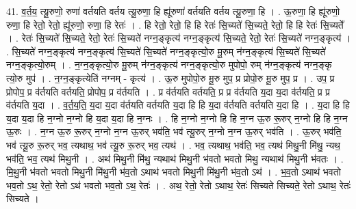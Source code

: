 \documentclass[17pt]{extarticle}
\begin{document}
41. व॒र्त॒य॒ त्यू॒रुणो॒ रुणा॑ वर्तयति वर्तय त्यू॒रुणा॒ हि ह्यू॑रुणा॑ वर्तयति वर्तय त्यू॒रुणा॒ हि । . ऊ॒रुणा॒ हि ह्यू॑रुणो॒ रुणा॒ हि रेतो॒ रेतो॒ ह्यू॑रुणो॒ रुणा॒ हि रेतः॑ । . हि रेतो॒ रेतो॒ हि हि रेतः॑ सि॒च्यते॑ सि॒च्यते॒ रेतो॒ हि हि रेतः॑ सि॒च्यते᳚ । . रेतः॑ सि॒च्यते॑ सि॒च्यते॒ रेतो॒ रेतः॑ सि॒च्यते॑ नग्न॒ङ्कृत्य॑ नग्न॒ङ्कृत्य॑ सि॒च्यते॒ रेतो॒ रेतः॑ सि॒च्यते॑ नग्न॒ङ्कृत्य॑ । . सि॒च्यते॑ नग्न॒ङ्कृत्य॑ नग्न॒ङ्कृत्य॑ सि॒च्यते॑ सि॒च्यते॑ नग्न॒ङ्कृत्यो॒रु मू॒रुम् न॑ग्न॒ङ्कृत्य॑ सि॒च्यते॑ सि॒च्यते॑ नग्न॒ङ्कृत्यो॒रुम् । . न॒ग्न॒ङ्कृत्यो॒रु मू॒रुम् न॑ग्न॒ङ्कृत्य॑ नग्न॒ङ्कृत्यो॒रु मुपोपो॒ रुम् न॑ग्न॒ङ्कृत्य॑ नग्न॒ङ्कृ
त्यो॒रु मुप॑ । . न॒ग्न॒ङ्कृत्येति॑ नग्नम् - कृत्य॑ । . ऊ॒रु मुपोपो॒रु मू॒रु मुप॒ प्र प्रोपो॒रु मू॒रु मुप॒ प्र । . उप॒ प्र प्रोपोप॒ प्र व॑र्तयति वर्तयति॒ प्रोपोप॒ प्र व॑र्तयति । . प्र व॑र्तयति वर्तयति॒ प्र प्र व॑र्तयति य॒दा य॒दा व॑र्तयति॒ प्र प्र व॑र्तयति य॒दा । . व॒र्त॒य॒ति॒ य॒दा य॒दा व॑र्तयति वर्तयति य॒दा हि हि य॒दा व॑र्तयति वर्तयति य॒दा हि । . य॒दा हि हि य॒दा य॒दा हि न॒ग्नो न॒ग्नो हि य॒दा य॒दा हि न॒ग्नः । . हि न॒ग्नो न॒ग्नो हि हि न॒ग्न ऊ॒रु रू॒रुर् न॒ग्नो हि हि न॒ग्न ऊ॒रुः । . न॒ग्न ऊ॒रु रू॒रुर् न॒ग्नो न॒ग्न ऊ॒रुर् भव॑ति॒ भव॑ त्यू॒रुर् न॒ग्नो न॒ग्न ऊ॒रुर् भव॑ति । . ऊ॒रुर् भव॑ति॒ भव॑ त्यू॒रु रू॒रुर् भव॒ त्यथाथ॒ भव॑ त्यू॒रु रू॒रुर् भव॒ त्यथ॑ । . भव॒ त्यथाथ॒ भव॑ति॒ भव॒ त्यथ॑ मिथु॒नी मि॑थु॒ न्यथ॒ भव॑ति॒ भव॒ त्यथ॑ मिथु॒नी । . अथ॑ मिथु॒नी मि॑थु॒ न्यथाथ॑ मिथु॒नी भ॑वतो भवतो मिथु॒ न्यथाथ॑ मिथु॒नी भ॑वतः । . मि॒थु॒नी भ॑वतो भवतो मिथु॒नी मि॑थु॒नी भ॑व॒तो ऽथाथ॑ भवतो मिथु॒नी मि॑थु॒नी भ॑व॒तो ऽथ॑ । . भ॒व॒तो ऽथाथ॑ भवतो भव॒तो ऽथ॒ रेतो॒ रेतो ऽथ॑ भवतो भव॒तो ऽथ॒ रेतः॑ । . अथ॒ रेतो॒ रेतो ऽथाथ॒ रेतः॑ सिच्यते सिच्यते॒ रेतो ऽथाथ॒ रेतः॑ सिच्यते । \newline
\end{document}
